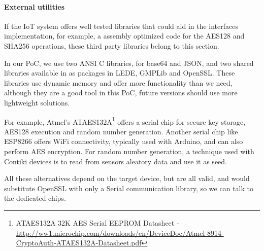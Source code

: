 \documentclass[journal]{IEEEtran}
\begin{document}
\paragraph{External utilities}\hfil

If the IoT system offers well tested libraries that could aid in the interfaces implementation, for example, a assembly optimized code for the AES128 and SHA256 operations, these third party libraries belong to this section.

In our PoC, we use two ANSI C libraries, for base64 and JSON, and two shared libraries available in as packages in LEDE, GMPLib and OpenSSL. These libraries use dynamic memory and offer more functionality than we need, although they are a good tool in this PoC, future versions should use more lightweight solutions.

For example, Atmel's ATAES132A\footnote{ATAES132A 32K AES Serial EEPROM  Datasheet - \url{http://ww1.microchip.com/downloads/en/DeviceDoc/Atmel-8914-CryptoAuth-ATAES132A-Datasheet.pdf}}
offers a serial chip for secure key storage, AES128 execution and random number generation. Another serial chip like ESP8266 offers WiFi connectivity, typically used with Arduino, and can also perform AES encryption. For random number generation, a technique used with Contiki devices is to read from sensors aleatory data and use it as seed.

All these alternatives depend on the target device, but are all valid, and would substitute OpenSSL with only a Serial communication library, so we can talk to the dedicated chips.
\end{document}
